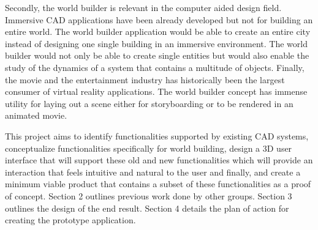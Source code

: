 Secondly, the world builder is relevant in the computer aided design field. Immersive CAD applications have been already developed but not for
building an entire world. The world builder application would be able to create an entire city instead of designing one single building in an immersive 
environment. The world builder would not only be able to create single entities but would also enable the study of the dynamics of a system that contains
a multitude of objects. Finally, the movie and the entertainment industry has historically been the largest consumer of virtual reality 
applications. The world builder concept has immense utility for laying out a scene either for storyboarding or to be rendered in an animated movie.


This project aims to identify functionalities supported by existing CAD systems, conceptualize functionalities specifically for world building, design
a 3D user interface that will support these old and new functionalities which will provide an interaction that feels intuitive and natural to the user
and finally, and create a minimum viable product that contains a subset of these functionalities as a proof of concept.
Section 2 outlines previous work done by other groups.  
Section 3 outlines the design of the end result.
Section 4 details the plan of action for creating the prototype application.
